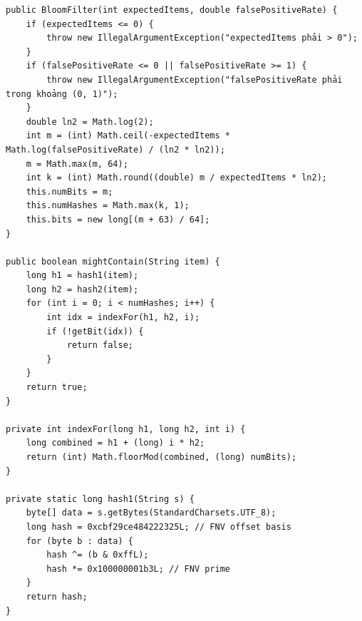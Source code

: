 \documentclass[9pt,twocolumn,a4paper]{extarticle}
\newcommand{\code}[1]{\texttt{#1}}
\begin{document}
\begin{minipage}{\linewidth}
\begin{lstlisting}[caption={\code{datastructure/BloomFilter.java}: tính $m$, $k$ và băm kép},label={lst:bloom}]
public BloomFilter(int expectedItems, double falsePositiveRate) {
    if (expectedItems <= 0) {
        throw new IllegalArgumentException("expectedItems phải > 0");
    }
    if (falsePositiveRate <= 0 || falsePositiveRate >= 1) {
        throw new IllegalArgumentException("falsePositiveRate phải trong khoảng (0, 1)");
    }
    double ln2 = Math.log(2);
    int m = (int) Math.ceil(-expectedItems * Math.log(falsePositiveRate) / (ln2 * ln2));
    m = Math.max(m, 64);
    int k = (int) Math.round((double) m / expectedItems * ln2);
    this.numBits = m;
    this.numHashes = Math.max(k, 1);
    this.bits = new long[(m + 63) / 64];
}

public boolean mightContain(String item) {
    long h1 = hash1(item);
    long h2 = hash2(item);
    for (int i = 0; i < numHashes; i++) {
        int idx = indexFor(h1, h2, i);
        if (!getBit(idx)) {
            return false;
        }
    }
    return true;
}

private int indexFor(long h1, long h2, int i) {
    long combined = h1 + (long) i * h2;
    return (int) Math.floorMod(combined, (long) numBits);
}

private static long hash1(String s) {
    byte[] data = s.getBytes(StandardCharsets.UTF_8);
    long hash = 0xcbf29ce484222325L; // FNV offset basis
    for (byte b : data) {
        hash ^= (b & 0xffL);
        hash *= 0x100000001b3L; // FNV prime
    }
    return hash;
}
\end{lstlisting}
\end{minipage}
\par\vspace{4pt}
\end{document}
